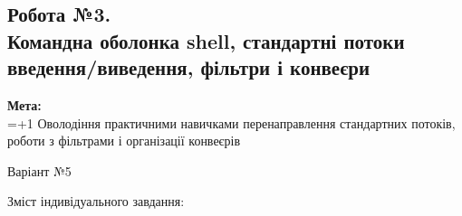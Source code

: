 \documentclass[a4paper,12pt]{article}
\begin{document}
\newpage
    \begin{center}
        \section*{\bfseries{Робота №3.\\
        Командна оболонка shell, стандартні
        потоки введення/виведення, фільтри і конвеєри}}
    \end{center}
    \textbf{Мета:} \\
    \hangindent=1.5cm 
    \hangafter=+1 \noindent
    Оволодіння практичними навичками
    перенаправлення стандартних потоків, роботи з
    фільтрами і організації конвеєрів \\
    \begin{center}
        \Large{Варіант №5}
    \end{center}
    Зміст індивідуального завдання:
\end{document}
